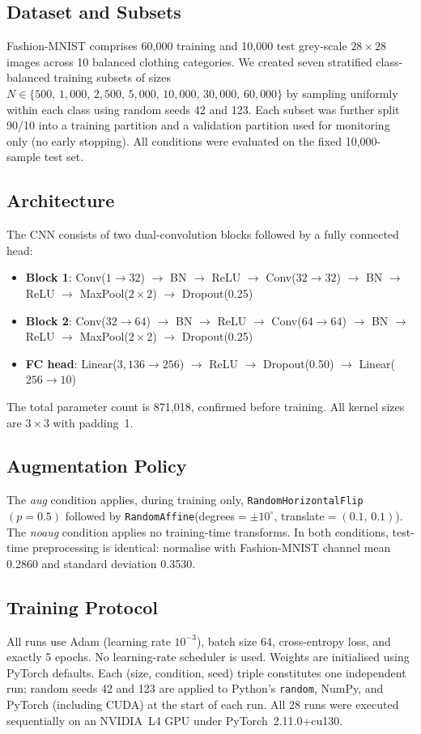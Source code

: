 \documentclass[11pt]{article}
\begin{document}
\subsection{Dataset and Subsets}
Fashion-MNIST \citep{mukhamediev2024state} comprises 60,000 training and 10,000
test grey-scale $28{\times}28$ images across 10 balanced clothing categories.
We created seven stratified class-balanced training subsets of sizes
$N \in \{500,\, 1{,}000,\, 2{,}500,\, 5{,}000,\, 10{,}000,\, 30{,}000,\, 60{,}000\}$
by sampling uniformly within each class using random seeds 42 and 123.
Each subset was further split 90/10 into a training partition and a validation
partition used for monitoring only (no early stopping).
All conditions were evaluated on the fixed 10,000-sample test set.

\subsection{Architecture}
The CNN consists of two dual-convolution blocks followed by a fully connected
head:
\begin{itemize}[nosep]
  \item \textbf{Block 1}: Conv($1{\to}32$) $\to$ BN $\to$ ReLU $\to$
        Conv($32{\to}32$) $\to$ BN $\to$ ReLU $\to$ MaxPool($2{\times}2$)
        $\to$ Dropout(0.25)
  \item \textbf{Block 2}: Conv($32{\to}64$) $\to$ BN $\to$ ReLU $\to$
        Conv($64{\to}64$) $\to$ BN $\to$ ReLU $\to$ MaxPool($2{\times}2$)
        $\to$ Dropout(0.25)
  \item \textbf{FC head}: Linear($3{,}136{\to}256$) $\to$ ReLU
        $\to$ Dropout(0.50) $\to$ Linear($256{\to}10$)
\end{itemize}
The total parameter count is 871,018, confirmed before training.
All kernel sizes are $3{\times}3$ with padding~1.

\subsection{Augmentation Policy}
The \textit{aug} condition applies, during training only,
\texttt{RandomHorizontalFlip}$(p{=}0.5)$ followed by
\texttt{RandomAffine}(degrees$=\pm10^\circ$, translate$=(0.1,\,0.1)$).
The \textit{noaug} condition applies no training-time transforms.
In both conditions, test-time preprocessing is identical: normalise with
Fashion-MNIST channel mean 0.2860 and standard deviation 0.3530.

\subsection{Training Protocol}
All runs use Adam (learning rate $10^{-3}$), batch size 64,
cross-entropy loss, and exactly 5 epochs.
No learning-rate scheduler is used.
Weights are initialised using PyTorch defaults.
Each (size, condition, seed) triple constitutes one independent run;
random seeds 42 and 123 are applied to Python's \texttt{random}, NumPy, and
PyTorch (including CUDA) at the start of each run.
All 28 runs were executed sequentially on an NVIDIA~L4 GPU under
PyTorch~2.11.0+cu130.
\end{document}
